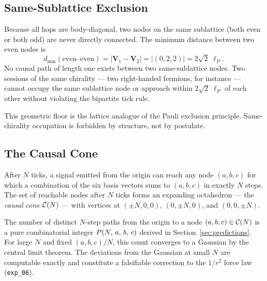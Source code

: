 \begin{figure}[htbp]
    \centering
    
    \label{fig:lattice_structure}
\end{figure}

\subsection{Same-Sublattice Exclusion}
\label{subsec:exclusion}

Because all hops are body-diagonal, two nodes on the same sublattice
(both even or both odd) are never directly connected.
The minimum distance between two even nodes is
\begin{equation}
    d_{\min}(\text{even--even})
        = |\mathbf{V}_1 - \mathbf{V}_2|
        = |(0,2,2)| = 2\sqrt{2}\;\ell_P.
    \label{eq:even_even}
\end{equation}
No causal path of length one exists between two same-sublattice nodes.
Two sessions of the same chirality --- two right-handed fermions, for
instance --- cannot occupy the same sublattice node or approach within
$2\sqrt{2}\;\ell_P$ of each other without violating the bipartite tick rule.

This geometric floor is the lattice analogue of the Pauli exclusion
principle.
Same-chirality occupation is forbidden by structure, not by postulate.

\subsection{The Causal Cone}
\label{subsec:cone}

After $N$ ticks, a signal emitted from the origin can reach any node
$(a, b, c)$ for which a combination of the six basis vectors sums to
$(a, b, c)$ in exactly $N$ steps.
The set of reachable nodes after $N$ ticks forms an expanding octahedron
--- the \emph{causal cone} $\mathcal{C}(N)$ --- with vertices at
$(\pm N, 0, 0)$, $(0, \pm N, 0)$, and $(0, 0, \pm N)$.

The number of distinct $N$-step paths from the origin to a node
$(a, b, c) \in \mathcal{C}(N)$ is a pure combinatorial integer
$P(N,\,a,\,b,\,c)$ derived in Section~\ref{sec:predictions}.
For large $N$ and fixed $(a,b,c)/N$, this count converges to a Gaussian
by the central limit theorem.
The deviations from the Gaussian at small $N$ are computable exactly and
constitute a falsifiable correction to the $1/r^2$ force law
(\texttt{exp\_06}).

